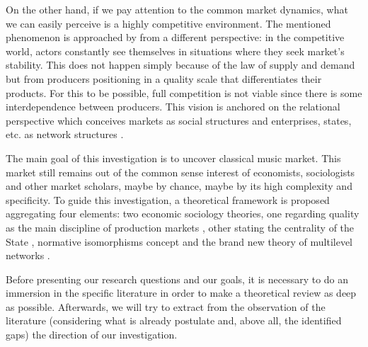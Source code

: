 \documentclass[a4paper, 12pt, openright, oneside, german, french, brazil, english, article]{abntex2}
\begin{document}
	On the other hand, if we pay attention to the common market dynamics, what we can easily perceive is a highly competitive environment. The mentioned phenomenon is approached by  from a different perspective: in the competitive world, actors constantly see themselves in situations where they seek market's stability. This does not happen simply because of the law of supply and demand but from producers positioning in a quality scale that differentiates their products. For this to be possible, full competition is not viable since there is some interdependence between producers. This vision is anchored on the relational perspective which conceives markets as social structures and enterprises, states, etc. as network structures \cite{white2008,white2002markets,lazega2014redes}.


	
	The main goal of this investigation is to uncover classical music market. This market still remains out of the common sense interest of economists, sociologists and other market scholars, maybe by chance, maybe by its high complexity and specificity. To guide this investigation, a theoretical framework is proposed aggregating four elements: two economic sociology theories, one regarding quality as the main discipline of production markets \cite{white2002markets}, other stating the centrality of the State \cite{fligstein2002architecture}, normative isomorphisms concept \cite{dimaggio1983iron} and the brand new theory of multilevel networks \cite{lazega2016multilevel}.
	
	Before presenting our research questions and our goals, it is necessary to do an immersion in the specific literature in order to make a theoretical review as deep as possible. Afterwards, we will try to extract from the observation of the literature (considering what is already postulate and, above all, the identified gaps) the direction of our investigation.
\end{document}
